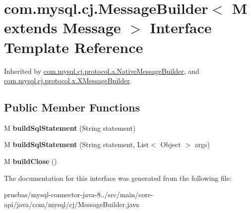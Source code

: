 \hypertarget{interfacecom_1_1mysql_1_1cj_1_1_message_builder}{}\section{com.\+mysql.\+cj.\+Message\+Builder$<$ M extends Message $>$ Interface Template Reference}
\label{interfacecom_1_1mysql_1_1cj_1_1_message_builder}


Inherited by \mbox{\hyperlink{classcom_1_1mysql_1_1cj_1_1protocol_1_1a_1_1_native_message_builder}{com.\+mysql.\+cj.\+protocol.\+a.\+Native\+Message\+Builder}}, and \mbox{\hyperlink{classcom_1_1mysql_1_1cj_1_1protocol_1_1x_1_1_x_message_builder}{com.\+mysql.\+cj.\+protocol.\+x.\+X\+Message\+Builder}}.

\subsection*{Public Member Functions}
\begin{DoxyCompactItemize}
\item 
\mbox{\label{interfacecom_1_1mysql_1_1cj_1_1_message_builder_ab18c136ad40edd22c321cae8c222e6ad}} 
M {\bfseries build\+Sql\+Statement} (String statement)
\item 
\mbox{\label{interfacecom_1_1mysql_1_1cj_1_1_message_builder_a592efa3bace2a15138d4bed34dd37e28}} 
M {\bfseries build\+Sql\+Statement} (String statement, List$<$ Object $>$ args)
\item 
\mbox{\label{interfacecom_1_1mysql_1_1cj_1_1_message_builder_a8e2e854f8680445177dfb45482990c34}} 
M {\bfseries build\+Close} ()
\end{DoxyCompactItemize}


The documentation for this interface was generated from the following file\+:\begin{DoxyCompactItemize}
\item 
pruebas/mysql-\/connector-\/java-\/8../src/main/core-\/api/java/com/mysql/cj/Message\+Builder.\+java\end{DoxyCompactItemize}
